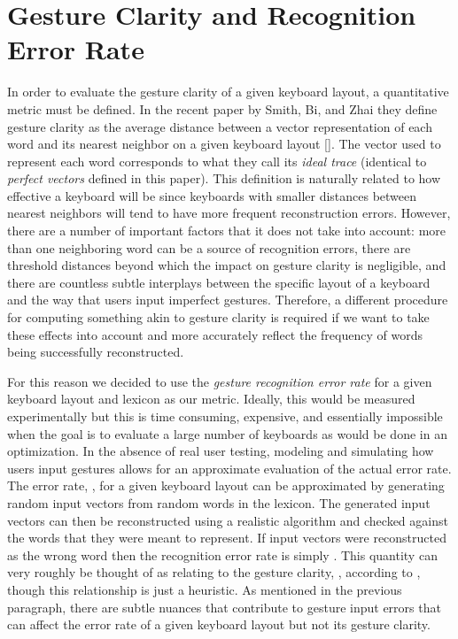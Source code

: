 \documentclass[final,1p,times,authoryear]{elsarticle}
\begin{document}
\section{\textbf{Gesture Clarity and Recognition Error Rate}}\label{sec:gcMethods}
In order to evaluate the gesture clarity of a given keyboard layout, a quantitative metric
must be defined. In the recent paper by Smith, Bi, and Zhai they define gesture clarity as
the average distance between a vector representation of each word and its nearest neighbor on a given keyboard layout [\cite{googleKeyboard}].
The vector used to represent each word corresponds to what they call its \textit{ideal trace} (identical to \textit{perfect vectors} defined in this paper).
This definition is naturally related to how effective a keyboard will be since keyboards with smaller distances between nearest neighbors will tend to have more frequent reconstruction errors.
However, there are a number of important factors that it does not take into account:
more than one neighboring word can be a source of recognition errors, there are threshold distances beyond which the impact on gesture clarity is negligible, and there are countless subtle interplays between the specific layout of a keyboard and the way that users input imperfect gestures.
Therefore, a different procedure for computing something akin to gesture clarity is required if we want to take these effects into account and more accurately reflect the frequency of words being successfully reconstructed.

For this reason we decided to use the \textit{gesture recognition error rate} for a given keyboard layout and lexicon as our metric.
Ideally, this would be measured experimentally but this is time consuming, expensive, and essentially impossible when the goal is to evaluate a large number of keyboards as would be done in an optimization.
In the absence of real user testing, modeling and simulating how users input gestures allows for an approximate evaluation of the actual error rate.
The error rate, , for a given keyboard layout can be approximated by generating  random input vectors from random words in the lexicon.
The generated input vectors can then be reconstructed using a realistic algorithm and checked against the words that they were meant to represent.
If  input vectors were reconstructed as the wrong word then the recognition error rate is simply .
This quantity can very roughly be thought of as relating to the gesture clarity, , according to , though this relationship is just a heuristic. As mentioned in the previous paragraph, there are subtle nuances that contribute to gesture input errors that can affect the error rate of a given keyboard layout but not its gesture clarity.
\end{document}
